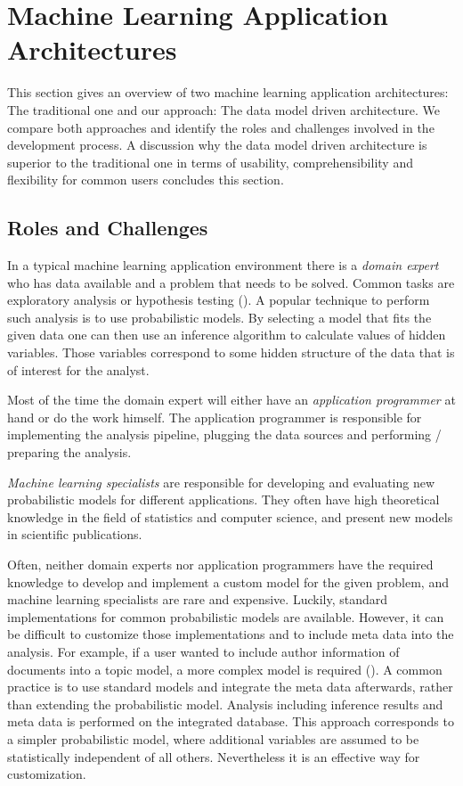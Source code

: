 \section{Machine Learning Application Architectures}

This section gives an overview of two machine learning application architectures: The traditional one and our approach: The data model driven architecture. We compare both approaches and identify the roles and challenges involved in the development process. A discussion why the data model driven architecture is superior to the traditional one in terms of usability, comprehensibility and flexibility for common users concludes this section.

\subsection{Roles and Challenges}

In a typical machine learning application environment there is a \emph{domain expert} who has data available and a problem that needs to be solved. Common tasks are exploratory analysis or hypothesis testing (\cite{tukey1980we}). A popular technique to perform such analysis is to use probabilistic models. By selecting a model that fits the given data one can then use an inference algorithm to calculate values of hidden variables. Those variables correspond to some hidden structure of the data that is of interest for the analyst.

Most of the time the domain expert will either have an \emph{application programmer} at hand or do the work himself. The application programmer is responsible for implementing the analysis pipeline, plugging the data sources and performing / preparing the analysis.

\emph{Machine learning specialists} are responsible for developing and evaluating new probabilistic models for different applications. They often have high theoretical knowledge in the field of statistics and computer science, and present new models in scientific publications.

Often, neither domain experts nor application programmers have the required knowledge to develop and implement a custom model for the given problem, and machine learning specialists are rare and expensive. Luckily, standard implementations for common probabilistic models are available. However, it can be difficult to customize those implementations and to include meta data into the analysis. For example, if a user wanted to include author information of documents into a topic model, a more complex model is required (\cite{rosen2004author}). A common practice is to use standard models and integrate the meta data afterwards, rather than extending the probabilistic model. Analysis including inference results and meta data is performed on the integrated database. This approach corresponds to a simpler probabilistic model, where additional variables are assumed to be statistically independent of all others. Nevertheless it is an effective way for customization.

